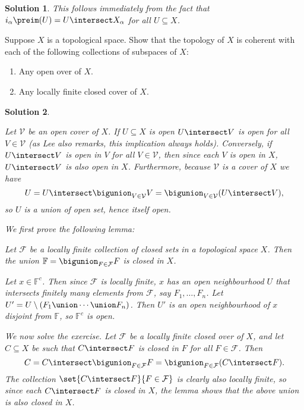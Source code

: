 \documentclass[article, a4paper, 11pt, oneside]{memoir}
\numberwithin{equation}{chapter}
\renewenvironment{problemframed}[1][]{%
    \setsepchar{.}%
    \readlist*\mylist{#1}%
    \def\smalllabel{\mylist[2].\mylist[3]}%
    \refstepcounter{problemframed}%
    \begin{problemframed*}[#1]%
    \label{prob:#1}%
}{%
    \end{problemframed*}%
}
\theoremstyle{nonumberplain}
\newtheorem{solution}{Solution}
\newenvironment{displaytheorem}{%
	\begin{displayquote}\itshape%
}{%
	\end{displayquote}%
}
\newcommand{\calV}{\mathcal{V}}
\newcommand{\calF}{\mathcal{F}}
\newcommand{\bbF}{\mathbb{F}}
\begin{document}
\begin{solution}
    This follows immediately from the fact that $i_\alpha\preim(U) = U \intersect X_\alpha$ for all $U \subseteq X$.
\end{solution}


\begin{problemframed}[5.6]
    Suppose $X$ is a topological space. Show that the topology of $X$ is coherent with each of the following collections of subspaces of $X$:
    \begin{enumerate}
        \item Any open over of $X$.
        \item Any locally finite closed cover of $X$.
    \end{enumerate}
\end{problemframed}

\begin{solution}
\begin{solutionsec}
    \item Let $\calV$ be an open cover of $X$. If $U \subseteq X$ is open $U \intersect V$ is open for all $V \in \calV$ (as Lee also remarks, this implication always holds). Conversely, if $U \intersect V$ is open in $V$ for all $V \in \calV$, then since each $V$ is open in $X$, $U \intersect V$ is also open in $X$. Furthermore, because $\calV$ is a cover of $X$ we have
    \begin{equation*}
        U
            = U \intersect \bigunion_{V \in \calV} V
            = \bigunion_{V \in \calV} (U \intersect V),
    \end{equation*}
    so $U$ is a union of open set, hence itself open.

    \item We first prove the following lemma:
    \begin{displaytheorem}
        Let $\calF$ be a locally finite collection of closed sets in a topological space $X$. Then the union $\bbF = \bigunion_{F \in \calF} F$ is closed in $X$.
    \end{displaytheorem}
    Let $x \in \bbF^c$. Then since $\calF$ is locally finite, $x$ has an open neighbourhood $U$ that intersects finitely many elements from $\calF$, say $F_1, \ldots, F_n$. Let $U' = U \setminus (F_1 \union \cdots \union F_n)$. Then $U'$ is an open neighbourhood of $x$ disjoint from $\bbF$, so $\bbF^c$ is open.
    
    We now solve the exercise. Let $\calF$ be a locally finite closed over of $X$, and let $C \subseteq X$ be such that $C \intersect F$ is closed in $F$ for all $F \in \calF$. Then
    \begin{equation*}
        C
            = C \intersect \bigunion_{F \in \calF} F
            = \bigunion_{F \in \calF} (C \intersect F).
    \end{equation*}
    The collection $\set{C \intersect F}{F \in \calF}$ is clearly also locally finite, so since each $C \intersect F$ is closed in $X$, the lemma shows that the above union is also closed in $X$.
\end{solutionsec}
\end{solution}
\end{document}
